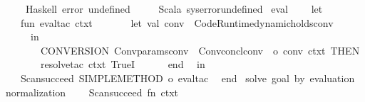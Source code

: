 \begin{isabellebody}
\ \ \ \ \ {\isacharparenleft}{\kern0pt}Haskell{\isacharparenright}{\kern0pt}\ {\isachardoublequoteopen}error{\isacharslash}{\kern0pt}\ {\isachardoublequote}{\kern0pt}undefined{\isachardoublequote}{\kern0pt}{\isachardoublequoteclose}\isanewline
\ \ \ \ \ {\isacharparenleft}{\kern0pt}Scala{\isacharparenright}{\kern0pt}\ {\isachardoublequoteopen}{\isacharbang}{\kern0pt}sys{\isachardot}{\kern0pt}error{\isacharparenleft}{\kern0pt}{\isachardoublequote}{\kern0pt}undefined{\isachardoublequote}{\kern0pt}{\isacharparenright}{\kern0pt}{\isachardoublequoteclose}%
\isadelimdocument
%
\endisadelimdocument
%
\isatagdocument
%
\isamarkuptrue%
%
\endisatagdocument
{\isafolddocument}%
%
\isadelimdocument
%
\endisadelimdocument
%
\isadelimML
%
\endisadelimML
%
\isatagML
{}\isamarkupfalse%
\ eval\ {\isacharequal}{\kern0pt}\ {\isacartoucheopen}\isanewline
\ \ let\isanewline
\ \ \ \ fun\ eval{\isacharunderscore}{\kern0pt}tac\ ctxt\ {\isacharequal}{\kern0pt}\isanewline
\ \ \ \ \ \ let\ val\ conv\ {\isacharequal}{\kern0pt}\ Code{\isacharunderscore}{\kern0pt}Runtime{\isachardot}{\kern0pt}dynamic{\isacharunderscore}{\kern0pt}holds{\isacharunderscore}{\kern0pt}conv\isanewline
\ \ \ \ \ \ in\isanewline
\ \ \ \ \ \ \ \ CONVERSION\ {\isacharparenleft}{\kern0pt}Conv{\isachardot}{\kern0pt}params{\isacharunderscore}{\kern0pt}conv\ {\isachartilde}{\kern0pt}{}\ {\isacharparenleft}{\kern0pt}Conv{\isachardot}{\kern0pt}concl{\isacharunderscore}{\kern0pt}conv\ {\isachartilde}{\kern0pt}{}\ o\ conv{\isacharparenright}{\kern0pt}\ ctxt{\isacharparenright}{\kern0pt}\ THEN{\isacharprime}{\kern0pt}\isanewline
\ \ \ \ \ \ \ \ resolve{\isacharunderscore}{\kern0pt}tac\ ctxt\ {\isacharbrackleft}{\kern0pt}TrueI{\isacharbrackright}{\kern0pt}\isanewline
\ \ \ \ \ \ end\isanewline
\ \ in\isanewline
\ \ \ \ Scan{\isachardot}{\kern0pt}succeed\ {\isacharparenleft}{\kern0pt}SIMPLE{\isacharunderscore}{\kern0pt}METHOD{\isacharprime}{\kern0pt}\ o\ eval{\isacharunderscore}{\kern0pt}tac{\isacharparenright}{\kern0pt}\isanewline
\ \ end\isanewline
{\isacartoucheclose}\ {\isachardoublequoteopen}solve\ goal\ by\ evaluation{\isachardoublequoteclose}\isanewline
\isanewline
{}\isamarkupfalse%
\ normalization\ {\isacharequal}{\kern0pt}\ {\isacartoucheopen}\isanewline
\ \ Scan{\isachardot}{\kern0pt}succeed\ {\isacharparenleft}{\kern0pt}fn\ ctxt\ {\isacharequal}{\kern0pt}{\isachargreater}{\kern0pt}\isanewline

\end{isabellebody}
